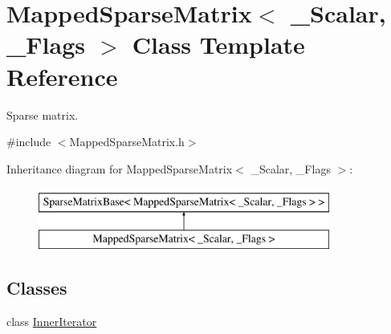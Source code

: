 \hypertarget{class_mapped_sparse_matrix}{\section{Mapped\-Sparse\-Matrix$<$ \-\_\-\-Scalar, \-\_\-\-Flags $>$ Class Template Reference}
\label{class_mapped_sparse_matrix}
}


Sparse matrix.  




{\ttfamily \#include $<$Mapped\-Sparse\-Matrix.\-h$>$}

Inheritance diagram for Mapped\-Sparse\-Matrix$<$ \-\_\-\-Scalar, \-\_\-\-Flags $>$\-:\begin{figure}[H]
\begin{center}
\leavevmode
\includegraphics[height=2.000000cm]{class_mapped_sparse_matrix}
\end{center}
\end{figure}
\subsection*{Classes}
\begin{DoxyCompactItemize}
\item 
class \hyperlink{class_mapped_sparse_matrix_1_1_inner_iterator}{Inner\-Iterator}
\end{DoxyCompactItemize}
